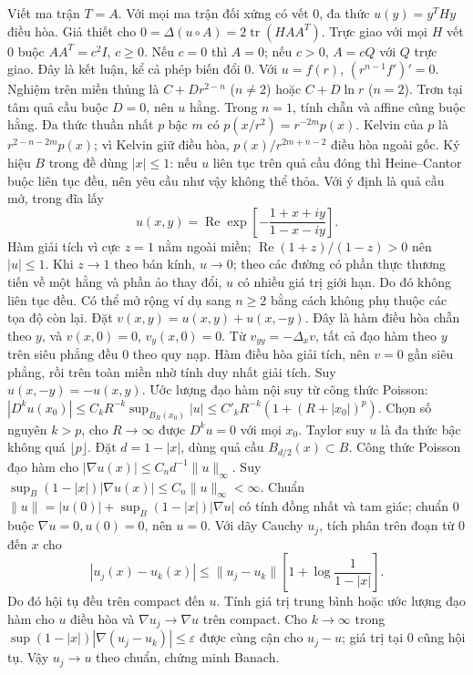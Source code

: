 Viết ma trận $T=A$. Với mọi ma trận đối xứng có vết 0, đa thức $u(y)=y^THy$ điều hòa. Giả thiết cho $0=\Delta(u\circ A)=2\operatorname{tr}(HAA^T)$. Trực giao với mọi $H$ vết 0 buộc $AA^T=c^2I$, $c\ge0$. Nếu $c=0$ thì $A=0$; nếu $c>0$, $A=cQ$ với $Q$ trực giao. Đây là kết luận, kể cả phép biến đổi 0.
Với $u=f(r)$, $(r^{n-1}f')'=0$. Nghiệm trên miền thủng là $C+Dr^{2-n}$ ($n\ne2$) hoặc $C+D\ln r$ ($n=2$). Trơn tại tâm quả cầu buộc $D=0$, nên $u$ hằng. Trong $n=1$, tính chẵn và affine cũng buộc hằng.
Đa thức thuần nhất $p$ bậc $m$ có $p(x/r^2)=r^{-2m}p(x)$. Kelvin của $p$ là $r^{2-n-2m}p(x)$; vì Kelvin giữ điều hòa, $p(x)/r^{2m+n-2}$ điều hòa ngoài gốc.
Ký hiệu $B$ trong đề dùng $|x|\le1$: nếu $u$ liên tục trên quả cầu đóng thì Heine--Cantor buộc liên tục đều, nên yêu cầu như vậy không thể thỏa. Với ý định là quả cầu mở, trong đĩa lấy
\[u(x,y)=\operatorname{Re}\exp\left[-\frac{1+x+iy}{1-x-iy}\right].\]
Hàm giải tích vì cực $z=1$ nằm ngoài miền; $\operatorname{Re}(1+z)/(1-z)>0$ nên $|u|\le1$. Khi $z\to1$ theo bán kính, $u\to0$; theo các đường có phần thực thương tiến về một hằng và phần ảo thay đổi, $u$ có nhiều giá trị giới hạn. Do đó không liên tục đều. Có thể mở rộng ví dụ sang $n\ge2$ bằng cách không phụ thuộc các tọa độ còn lại.
Đặt $v(x,y)=u(x,y)+u(x,-y)$. Đây là hàm điều hòa chẵn theo $y$, và $v(x,0)=0$, $v_y(x,0)=0$. Từ $v_{yy}=-\Delta_xv$, tất cả đạo hàm theo $y$ trên siêu phẳng đều 0 theo quy nạp. Hàm điều hòa giải tích, nên $v=0$ gần siêu phẳng, rồi trên toàn miền nhờ tính duy nhất giải tích. Suy $u(x,-y)=-u(x,y)$.
Ước lượng đạo hàm nội suy từ công thức Poisson: $|D^ku(x_0)|\le C_kR^{-k}\sup_{B_R(x_0)}|u|\le C'_kR^{-k}(1+(R+|x_0|)^p)$. Chọn số nguyên $k>p$, cho $R\to\infty$ được $D^ku=0$ với mọi $x_0$. Taylor suy $u$ là đa thức bậc không quá $\lfloor p\rfloor$.
Đặt $d=1-|x|$, dùng quả cầu $B_{d/2}(x)\subset B$. Công thức Poisson đạo hàm cho $|\nabla u(x)|\le C_nd^{-1}\|u\|_\infty$. Suy $\sup_B(1-|x|)|\nabla u(x)|\le C_n\|u\|_\infty<\infty$.
Chuẩn $\|u\|=|u(0)|+\sup_B(1-|x|)|\nabla u|$ có tính đồng nhất và tam giác; chuẩn 0 buộc $\nabla u=0,u(0)=0$, nên $u=0$. Với dãy Cauchy $u_j$, tích phân trên đoạn từ 0 đến $x$ cho
\[|u_j(x)-u_k(x)|\le\|u_j-u_k\|\left[1+\log\frac1{1-|x|}\right].\]
Do đó hội tụ đều trên compact đến $u$. Tính giá trị trung bình hoặc ước lượng đạo hàm cho $u$ điều hòa và $\nabla u_j\to\nabla u$ trên compact. Cho $k\to\infty$ trong $\sup(1-|x|)|\nabla(u_j-u_k)|\le\varepsilon$ được cùng cận cho $u_j-u$; giá trị tại 0 cũng hội tụ. Vậy $u_j\to u$ theo chuẩn, chứng minh Banach.
